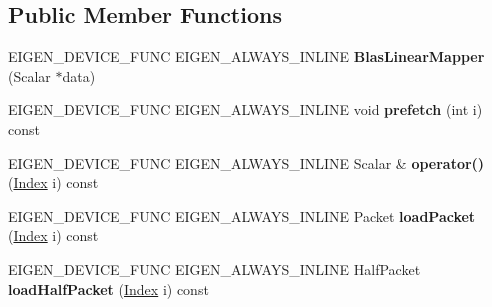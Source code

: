 \subsection*{Public Member Functions}
\begin{DoxyCompactItemize}
\item 
\mbox{\label{class_eigen_1_1internal_1_1_blas_linear_mapper_a7f663c011737427cae88044cc69b4918}} 
E\+I\+G\+E\+N\+\_\+\+D\+E\+V\+I\+C\+E\+\_\+\+F\+U\+NC E\+I\+G\+E\+N\+\_\+\+A\+L\+W\+A\+Y\+S\+\_\+\+I\+N\+L\+I\+NE {\bfseries Blas\+Linear\+Mapper} (Scalar $\ast$data)
\item 
\mbox{\label{class_eigen_1_1internal_1_1_blas_linear_mapper_ad17cc10aa0e1557737199bed14a1b784}} 
E\+I\+G\+E\+N\+\_\+\+D\+E\+V\+I\+C\+E\+\_\+\+F\+U\+NC E\+I\+G\+E\+N\+\_\+\+A\+L\+W\+A\+Y\+S\+\_\+\+I\+N\+L\+I\+NE void {\bfseries prefetch} (int i) const
\item 
\mbox{\label{class_eigen_1_1internal_1_1_blas_linear_mapper_a0b6a635dc05553ee31bde3a7c4527706}} 
E\+I\+G\+E\+N\+\_\+\+D\+E\+V\+I\+C\+E\+\_\+\+F\+U\+NC E\+I\+G\+E\+N\+\_\+\+A\+L\+W\+A\+Y\+S\+\_\+\+I\+N\+L\+I\+NE Scalar \& {\bfseries operator()} (\hyperlink{namespace_eigen_a62e77e0933482dafde8fe197d9a2cfde}{Index} i) const
\item 
\mbox{\label{class_eigen_1_1internal_1_1_blas_linear_mapper_a42eaa16ed738ea667a2d5f69fc6f5985}} 
E\+I\+G\+E\+N\+\_\+\+D\+E\+V\+I\+C\+E\+\_\+\+F\+U\+NC E\+I\+G\+E\+N\+\_\+\+A\+L\+W\+A\+Y\+S\+\_\+\+I\+N\+L\+I\+NE Packet {\bfseries load\+Packet} (\hyperlink{namespace_eigen_a62e77e0933482dafde8fe197d9a2cfde}{Index} i) const
\item 
\mbox{\label{class_eigen_1_1internal_1_1_blas_linear_mapper_ad0b309a443fe66f1a6c96ecc7e7d209e}} 
E\+I\+G\+E\+N\+\_\+\+D\+E\+V\+I\+C\+E\+\_\+\+F\+U\+NC E\+I\+G\+E\+N\+\_\+\+A\+L\+W\+A\+Y\+S\+\_\+\+I\+N\+L\+I\+NE Half\+Packet {\bfseries load\+Half\+Packet} (\hyperlink{namespace_eigen_a62e77e0933482dafde8fe197d9a2cfde}{Index} i) const
\item 
\mbox{\label{class_eigen_1_1internal_1_1_blas_linear_mapper_abe3c1c4047295e21b64e4f8bb13ddea5}} 

\end{DoxyCompactItemize}
